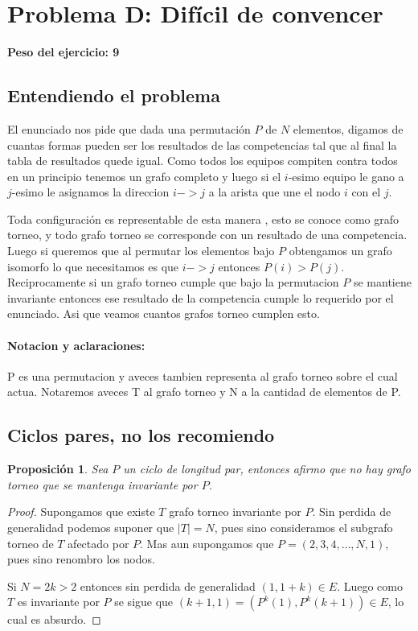 \newpage{}
\section{Problema D: Dif\'icil de convencer}
\textbf{Peso del ejercicio: 9 }

\newcommand{\mappend}{\operatorname{\bullet}}
\newcommand{\mempty}{\mathbf{\varepsilon}}
\newcommand{\sizeV}{\left|V\right|}
\newtheorem{prop}{Proposici\'on}
\newtheorem{lema}{Lema}

\subsection{Entendiendo el problema}
	El enunciado nos pide que dada una permutaci\'on $P$ de $N$ elementos, 
digamos de cuantas formas pueden ser los resultados de las 
competencias tal que al final la tabla de resultados quede igual. Como
todos los equipos compiten contra todos en un principio tenemos un grafo
completo y luego si el $i$-esimo equipo le gano a $j$-esimo le asignamos 
la direccion $i->j$ a la arista que une el nodo $i$ con el $j$. 


	Toda configuraci\'on es representable de esta
manera , esto se conoce como grafo torneo, y todo grafo torneo se corresponde
con un resultado de una competencia. Luego si queremos que al
permutar los elementos bajo $P$ obtengamos un grafo isomorfo lo que necesitamos
es que $i->j$ entonces $P(i)>P(j)$. Reciprocamente si un grafo torneo
cumple que bajo la permutacion $P$ se mantiene invariante entonces
ese resultado de la competencia cumple lo requerido por el enunciado. Asi 
que veamos cuantos grafos torneo cumplen esto.

\paragraph{Notacion y aclaraciones:} P es una permutacion y aveces tambien
representa al grafo torneo sobre el cual actua. Notaremos aveces T al grafo
torneo y N a la cantidad de elementos de P.


\subsection{Ciclos pares, no los recomiendo}
	\begin{prop}\label{ciclopar} 
		Sea $P$ un ciclo de longitud par, entonces afirmo que no hay grafo 
torneo que se mantenga invariante por $P$.
	\end{prop}
	\begin{proof}
		Supongamos que existe $T$ grafo torneo invariante por $P$. Sin perdida de
generalidad podemos suponer que $|T|=N$, pues sino consideramos el subgrafo
torneo de $T$ afectado por $P$. Mas aun supongamos que
$P=(2,3,4,\dots , N, 1)$, pues sino renombro los nodos.

	
		Si $N=2k>2$ entonces sin perdida de generalidad $(1,1+k) \in E$. Luego
como $T$ es invariante por $P$ se sigue que 
$(k+1,1) = (P^k(1),P^k(k+1)) \in E$, lo cual es absurdo. 
	\end{proof}
	
